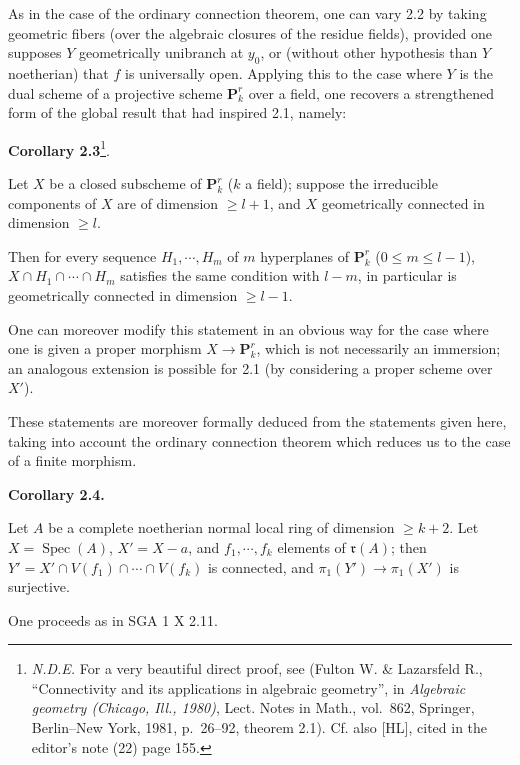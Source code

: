\documentclass[
  11pt,
  a4paper,
]{book}
\begin{document}
As in the case of the ordinary connection theorem, one can vary 2.2 by
taking geometric fibers (over the algebraic closures of the residue
fields), provided one supposes \(Y\) geometrically unibranch at
\(y_{0}\), or (without other hypothesis than \(Y\) noetherian) that
\(f\) is universally open. Applying this to the case where \(Y\) is the
dual scheme of a projective scheme \(\mathbf{P}^{r}_{k}\) over a field,
one recovers a strengthened form of the global result that had inspired
2.1, namely:

\textbf{Corollary 2.3}\footnote{\emph{N.D.E.} For a very beautiful
  direct proof, see (Fulton W. \& Lazarsfeld R., ``Connectivity and its
  applications in algebraic geometry'', in \emph{Algebraic geometry
  (Chicago, Ill., 1980)}, Lect. Notes in Math., vol.~862, Springer,
  Berlin--New York, 1981, p.~26--92, theorem 2.1). Cf. also {[}HL{]},
  cited in the editor's note (22) page 155.}.

Let \(X\) be a closed subscheme of \(\mathbf{P}^{r}_{k}\) (\(k\) a
field); suppose the irreducible components of \(X\) are of dimension
\(\geqslant l + 1\), and \(X\) geometrically connected in dimension
\(\geqslant l\).

Then for every sequence \(H_{1}, \cdots, H_{m}\) of \(m\) hyperplanes of
\(\mathbf{P}^{r}_{k}\) (\(0 \leqslant m \leqslant l -
1\)), \(X \cap H_{1} \cap \cdots \cap H_{m}\) satisfies the same
condition with \(l - m\), in particular is geometrically connected in
dimension \(\geqslant l - 1\).

One can moreover modify this statement in an obvious way for the case
where one is given a proper morphism \(X \to
\mathbf{P}^{r}_{k}\), which is not necessarily an immersion; an
analogous extension is possible for 2.1 (by considering a proper scheme
over \(X'\)).

These statements are moreover formally deduced from the statements given
here, taking into account the ordinary connection theorem which reduces
us to the case of a finite morphism.

\textbf{Corollary 2.4.}

Let \(A\) be a complete noetherian normal local ring of dimension
\(\geqslant k + 2\). Let \(X = \operatorname{Spec}(A)\), \(X'
= X - {a}\), and \(f_{1}, \cdots, f_{k}\) elements of
\(\mathfrak{r}(A)\); then \(Y' = X' \cap V(f_{1}) \cap \cdots \cap
V(f_{k})\) is connected, and \(\pi_{1}(Y') \to \pi_{1}(X')\) is
surjective.

One proceeds as in SGA 1 X 2.11.
\end{document}
